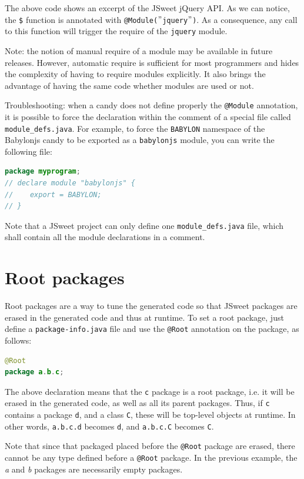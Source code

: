 \documentclass[a4paper]{report}
\begin{document}
The above code shows an excerpt of the JSweet jQuery API. As we can notice, the \texttt{\$} function is annotated with \texttt{@Module($"$jquery$"$)}. As a consequence, any call to this function will trigger the require of the \texttt{jquery} module.

Note: the notion of manual require of a module may be available in future releases. However, automatic require is sufficient for most programmers and hides the complexity of having to require modules explicitly. It also brings the advantage of having the same code whether modules are used or not.

Troubleshooting: when a candy does not define properly the \texttt{@Module} annotation, it is possible to force the declaration within the comment of a special file called \texttt{module\_defs.java}. For example, to force the \texttt{BABYLON} namespace of the Babylonjs candy to be exported as a \texttt{babylonjs} module, you can write the following file:

\begin{lstlisting}[language=Java]
package myprogram;
// declare module "babylonjs" {
//    export = BABYLON;
// } 
\end{lstlisting}

Note that a JSweet project can only define one \texttt{module\_defs.java} file, which shall contain all the module declarations in a comment.

\section{Root packages}

Root packages are a way to tune the generated code so that JSweet packages are erased in the generated code and thus at runtime. To set a root package, just define a \texttt{package-info.java} file and use the \texttt{@Root} annotation on the package, as follows:

\begin{lstlisting}[language=Java]
@Root
package a.b.c;
\end{lstlisting}

The above declaration means that the \texttt{c} package is a root package, i.e. it will be erased in the generated code, as well as all its parent packages. Thus, if \texttt{c} contains a package \texttt{d}, and a class \texttt{C}, these will be top-level objects at runtime. In other words, \texttt{a.b.c.d} becomes \texttt{d}, and \texttt{a.b.c.C} becomes \texttt{C}.

Note that since that packaged placed before the \texttt{@Root} package are erased, there cannot be any type defined before a \texttt{@Root} package. In the previous example, the \emph{a} and \emph{b} packages are necessarily empty packages.
\end{document}
